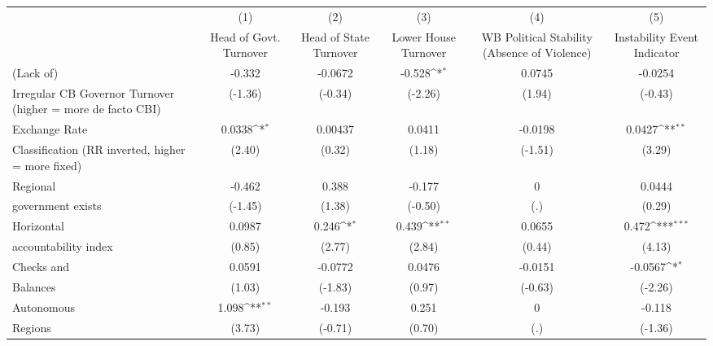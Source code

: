 {
\def\sym#1{\ifmmode^{#1}\else\(^{#1}\)\fi}
\begin{tabular}{l*{5}{c}}
\toprule
                &\multicolumn{1}{c}{(1)}&\multicolumn{1}{c}{(2)}&\multicolumn{1}{c}{(3)}&\multicolumn{1}{c}{(4)}&\multicolumn{1}{c}{(5)}\\
                &\multicolumn{1}{c}{Head of Govt. Turnover}&\multicolumn{1}{c}{Head of State Turnover}&\multicolumn{1}{c}{Lower House Turnover}&\multicolumn{1}{c}{WB Political Stability (Absence of Violence)}&\multicolumn{1}{c}{Instability Event Indicator}\\
\midrule
(Lack of)       &   -0.332         &  -0.0672         &   -0.528\sym{*}  &   0.0745         &  -0.0254         \\
Irregular CB Governor Turnover (higher = more de facto CBI)&  (-1.36)         &  (-0.34)         &  (-2.26)         &   (1.94)         &  (-0.43)         \\
\addlinespace
Exchange Rate   &   0.0338\sym{*}  &  0.00437         &   0.0411         &  -0.0198         &   0.0427\sym{**} \\
Classification (RR inverted, higher = more fixed)&   (2.40)         &   (0.32)         &   (1.18)         &  (-1.51)         &   (3.29)         \\
\addlinespace
Regional        &   -0.462         &    0.388         &   -0.177         &        0         &   0.0444         \\
government exists   &  (-1.45)         &   (1.38)         &  (-0.50)         &      (.)         &   (0.29)         \\
\addlinespace
Horizontal      &   0.0987         &    0.246\sym{*}  &    0.439\sym{**} &   0.0655         &    0.472\sym{***}\\
accountability index&   (0.85)         &   (2.77)         &   (2.84)         &   (0.44)         &   (4.13)         \\
\addlinespace
Checks and      &   0.0591         &  -0.0772         &   0.0476         &  -0.0151         &  -0.0567\sym{*}  \\
Balances        &   (1.03)         &  (-1.83)         &   (0.97)         &  (-0.63)         &  (-2.26)         \\
\addlinespace
Autonomous      &    1.098\sym{**} &   -0.193         &    0.251         &        0         &   -0.118         \\
Regions         &   (3.73)         &  (-0.71)         &   (0.70)         &      (.)         &  (-1.36)         \\

\end{tabular}}
